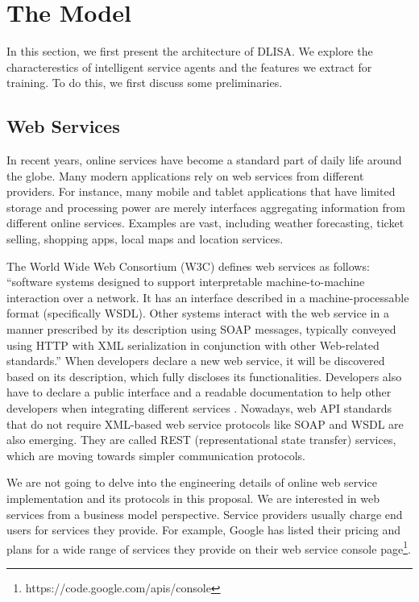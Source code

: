 \documentclass[10pt,journal,cspaper,compsoc]{IEEEtran}
\begin{document}



\section{The Model}\label{s:preliminaries}
In this section, we first present the architecture of DLISA. We explore the characterestics of intelligent service agents and the features we extract for training. To do this, we first discuss some preliminaries.

\subsection{Web Services}\label{s:ws}

In recent years, online services have become a standard part of daily life around the globe. Many modern applications rely on web services from different providers. For instance, many mobile and tablet applications that have limited storage and processing power are merely interfaces aggregating information from different online services. Examples are vast, including weather forecasting, ticket selling, shopping apps, local maps and location services.

The World Wide Web Consortium (W3C) defines web services as follows: ``software systems designed to support interpretable machine-to-machine interaction over a network. It has an interface described in a machine-processable format (specifically WSDL). Other systems interact with the web service in a manner prescribed by its description using SOAP messages, typically conveyed using HTTP with XML serialization in conjunction with other Web-related standards.'' When developers declare a new web service, it will be
discovered based on its description, which fully discloses its functionalities. Developers also have to declare a public interface and a readable documentation to help other developers when integrating different services \cite{w3cwsdl}. Nowadays, web API standards that do not require XML-based web service protocols like SOAP and WSDL are also emerging. They are called REST (representational state transfer) services, which are moving towards simpler communication protocols. 

We are not going to delve into the engineering details of online web service implementation and its protocols in this proposal. We are interested in web services from a business model perspective. Service providers usually charge end users for services they provide. For example, Google has listed their pricing and plans for a wide range of services they provide on their web service console page\footnote{https://code.google.com/apis/console}.
\end{document}
